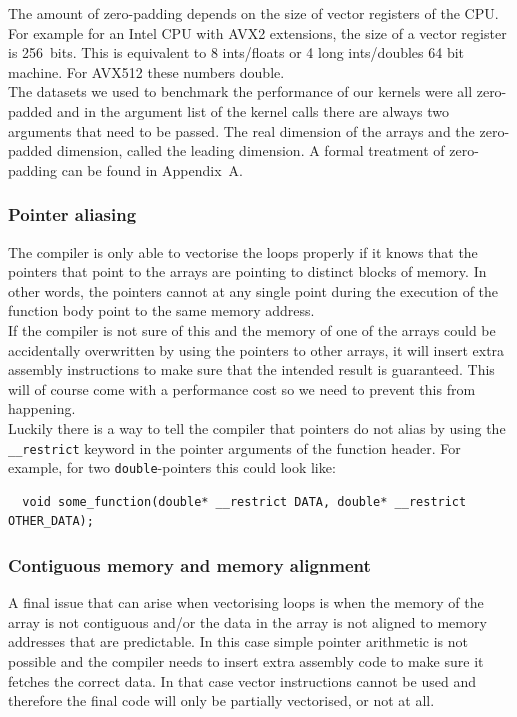 \documentclass[11pt]{article}
\numberwithin{figure}{section}
\numberwithin{table}{section}
\begin{document}
      The amount of zero-padding depends on the size of vector registers of the CPU. For example for an Intel CPU with AVX2 extensions, the size of a vector register is 256~bits. This is equivalent to 8 ints/floats or 4 long ints/doubles 64 bit machine. For AVX512 these numbers double.\\
      
      The datasets we used to benchmark the performance of our kernels were all zero-padded and in the argument list of the kernel calls there are always two arguments that need to be passed. The real dimension of the arrays and the zero-padded dimension, called the leading dimension. A formal treatment of zero-padding can be found in Appendix~A.

      \subsubsection{Pointer aliasing}
        The compiler is only able to vectorise the loops properly if it knows that the pointers that point to the  arrays are pointing to distinct blocks of memory. In other words, the pointers cannot at any single point during the execution of the function body point to the same memory address. \\
      
        If the compiler is not sure of this and the memory of one of the arrays could be accidentally overwritten by using the pointers to other arrays, it will insert extra assembly instructions to make sure that the intended result is guaranteed. This will of course come with a performance cost so we need to prevent this from happening.\\
      
        Luckily there is a way to tell the compiler that pointers do not alias by using the \texttt{\_\_restrict} keyword in the pointer arguments of the function header. For example, for two \texttt{double}-pointers this could look like:
      \begin{verbatim}
  void some_function(double* __restrict DATA, double* __restrict OTHER_DATA);
      \end{verbatim}

      \subsubsection{Contiguous memory and memory alignment}
        A final issue that can arise when vectorising loops is when the memory of the array is not contiguous and/or the data in the array is not aligned to memory addresses that are predictable. In this case simple pointer arithmetic is not possible and the compiler needs to insert extra assembly code to make sure it fetches the correct data. In that case vector instructions cannot be used and therefore the final code will only be partially vectorised, or not at all.\\
        
\end{document}
